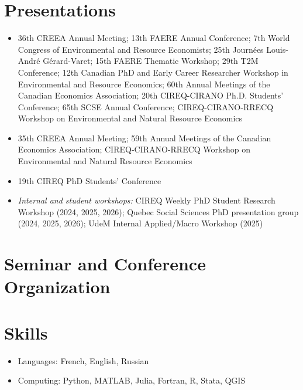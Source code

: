 \documentclass[11pt,letterpaper]{article}
\newcommand{\when}[1]{{\unskip\nobreak\hfil\penalty50\hskip1em\hbox{}\nobreak\hfill #1%
  \parfillskip=0pt\finalhyphendemerits=0\par}}
\newenvironment{years}{%
  \begin{itemize}[leftmargin=5em, labelwidth=2.6em, labelsep=0.9em, align=left, itemsep=0.25em,
    before={\hyphenpenalty=10000 \exhyphenpenalty=10000 \emergencystretch=1.5em}]}
  {\end{itemize}}
\begin{document}
\section*{Presentations}

\begin{years}
\item[2026] 36th CREEA Annual Meeting; 13th FAERE Annual Conference; 7th World Congress of Environmental and Resource Economists; 25th Journées Louis-André Gérard-Varet; 15th FAERE Thematic Workshop; 29th T2M Conference; 12th Canadian PhD and Early Career Researcher Workshop in Environmental and Resource Economics; 60th Annual Meetings of the Canadian Economics Association; 20th CIREQ-CIRANO Ph.D. Students' Conference; 65th SCSE Annual Conference; CIREQ-CIRANO-RRECQ Workshop on Environmental and Natural Resource Economics
\item[2025] 35th CREEA Annual Meeting; 59th Annual Meetings of the Canadian Economics Association; CIREQ-CIRANO-RRECQ Workshop on Environmental and Natural Resource Economics
\item[2024] 19th CIREQ PhD Students' Conference
\end{years}
\begin{itemize}
\item \textit{Internal and student workshops:} CIREQ Weekly PhD Student Research Workshop (2024, 2025, 2026); Quebec Social Sciences PhD presentation group (2024, 2025, 2026); UdeM Internal Applied/Macro Workshop (2025)
\end{itemize}

\section*{Seminar and Conference Organization}


\section*{Skills}

\begin{itemize}
\item Languages: French, English, Russian
\item Computing: Python, MATLAB, Julia, Fortran, R, Stata, QGIS
\end{itemize}
\end{document}
